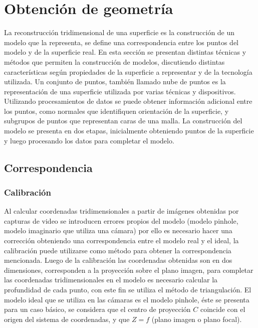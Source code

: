 \chapter{Obtención de geometría}

La reconstrucción tridimensional de una superficie es la construcción de un modelo que la representa, se define una correspondencia entre los puntos del modelo y de la superficie real. En esta sección se presentan distintas técnicas y métodos que permiten la construcción de modelos, discutiendo distintas características según propiedades de la superficie a representar y de la tecnología utilizada. Un conjunto de puntos, también llamado nube de puntos  es la representación de una superficie utilizada por varias técnicas y dispositivos. Utilizando procesamientos de datos se puede obtener información adicional entre los puntos, como normales que identifiquen orientación de la superficie, y subgrupos de puntos que representan caras de una malla. La construcción del modelo se presenta en dos etapas, inicialmente obteniendo puntos de la superficie y luego procesando los datos para completar el modelo.

\section{Correspondencia}

\subsection{Calibración}

Al calcular coordenadas tridimensionales a partir de imágenes obtenidas por capturas de video se introducen errores propios del modelo (modelo pinhole, modelo imaginario que utiliza una cámara) por ello es necesario hacer una corrección obteniendo una correspondencia entre el modelo real y el ideal, la calibración puede utilizarse como método para obtener la correspondencia mencionada. Luego de la calibración las coordenadas obtenidas son en dos dimensiones, corresponden a la proyección sobre el plano imagen, para completar las coordenadas tridimensionales en el modelo es necesario calcular la profundidad de cada punto, con este fin se utiliza el método de triangulación. El modelo ideal que se utiliza en las cámaras es el modelo pinhole, éste se presenta para un caso básico, se considera que el centro de proyección $C$ coincide con el origen del sistema de coordenadas, y que $Z = f$ (plano imagen o plano focal).

